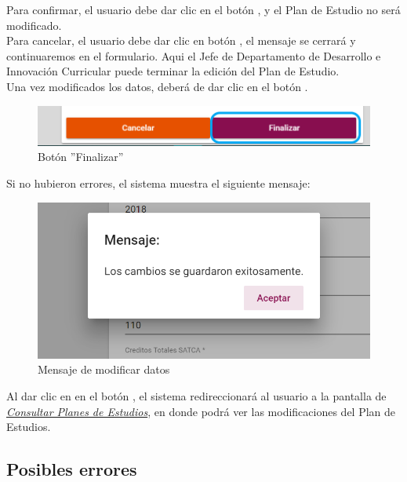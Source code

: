 Para confirmar, el usuario debe dar clic en el botón  , y el Plan de Estudio no será modificado.\\

Para cancelar, el usuario debe dar clic en botón  , el mensaje se cerrará y continuaremos en el formulario. Aqui el Jefe de Departamento de Desarrollo e Innovación Curricular puede terminar la edición del Plan de Estudio.\\

Una vez modificados los datos, deberá de dar clic en el botón  .
\begin{figure}[!hbtp]
	\centering
	\hypertarget{btnfin}{\includegraphics[width=0.7\linewidth]{images/SP4-GPE/editarPER}}
	\caption{Botón ''Finalizar''}
	\label{btnfin}
\end{figure}

Si no hubieron errores, el sistema muestra el siguiente mensaje:
\begin{figure}[!hbtp]
	\centering
	\hypertarget{ms2}{\includegraphics[width=0.7\linewidth]{images/SP4-GPE/m2}}
	\caption{Mensaje de modificar datos}
	\label{ms2}
\end{figure}


Al dar clic en en el botón  , el sistema redireccionará al usuario a la pantalla de \hyperlink{consultarPE}{\textit{Consultar Planes de Estudios}}, en donde podrá ver las modificaciones del Plan de Estudios.\\
\newpage
\subsection{Posibles errores}

